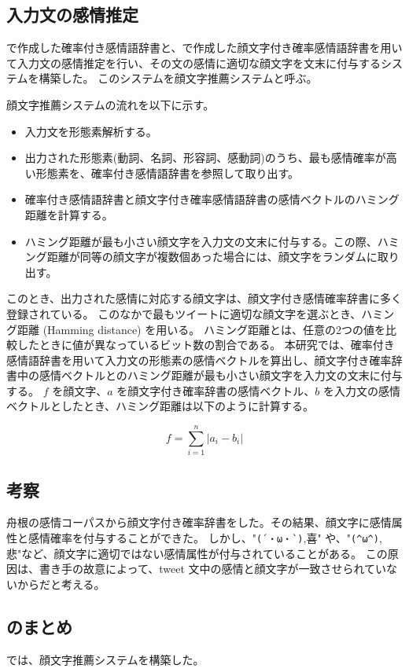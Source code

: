 \documentclass[11pt,a4j]{jsarticle}
\begin{document}
\subsection{入力文の感情推定}
で作成した確率付き感情語辞書と、で作成した顔文字付き確率感情語辞書を用いて入力文の感情推定を行い、その文の感情に適切な顔文字を文末に付与するシステムを構築した。
このシステムを顔文字推薦システムと呼ぶ。

顔文字推薦システムの流れを以下に示す。

\begin{itemize}
  \item
    入力文を形態素解析する。
  \item
    出力された形態素(動詞、名詞、形容詞、感動詞)のうち、最も感情確率が高い形態素を、確率付き感情語辞書を参照して取り出す。
  \item
    確率付き感情語辞書と顔文字付き確率感情語辞書の感情ベクトルのハミング距離を計算する。
  \item
    ハミング距離が最も小さい顔文字を入力文の文末に付与する。この際、ハミング距離が同等の顔文字が複数個あった場合には、顔文字をランダムに取り出す。
\end{itemize}

このとき、出力された感情に対応する顔文字は、顔文字付き感情確率辞書に多く登録されている。
このなかで最もツイートに適切な顔文字を選ぶとき、ハミング距離 (Hamming distance) を用いる。
ハミング距離とは、任意の2つの値を比較したときに値が異なっているビット数の割合である。
本研究では、確率付き感情語辞書を用いて入力文の形態素の感情ベクトルを算出し、顔文字付き確率辞書中の感情ベクトルとのハミング距離が最も小さい顔文字を入力文の文末に付与する。
$f$ を顔文字、$a$ を顔文字付き確率辞書の感情ベクトル、$b$ を入力文の感情ベクトルとしたとき、ハミング距離は以下のように計算する。

\[
  f=\sum_{i=1}^{n} |a_i-b_i|
\]

  \subsection{考察}
舟根の感情コーパスから顔文字付き確率辞書をした。その結果、顔文字に感情属性と感情確率を付与することができた。
しかし、"\verb|(´・ω・`)|,喜" や、"\verb|(^ω^)|,悲"など、顔文字に適切ではない感情属性が付与されていることがある。
この原因は、書き手の故意によって、tweet 文中の感情と顔文字が一致させられていないからだと考える。

  \subsection{ のまとめ}
では、顔文字推薦システムを構築した。
\end{document}
